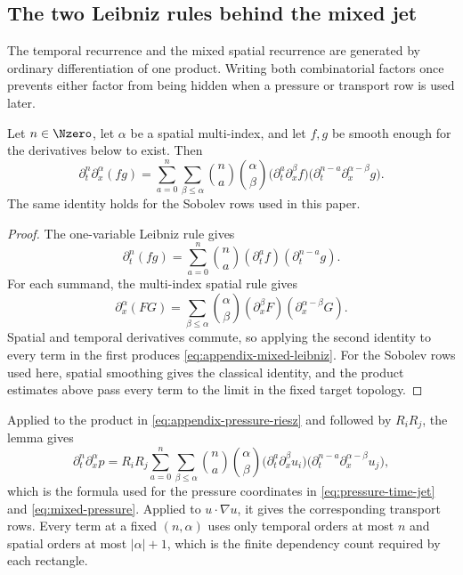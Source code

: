 \subsection{The two Leibniz rules behind the mixed jet}

The temporal recurrence and the mixed spatial recurrence are generated by ordinary differentiation of one product.
Writing both combinatorial factors once prevents either factor from being hidden when a pressure or transport row is used later.

\begin{lemma}
\label{lem:appendix-mixed-leibniz}
Let \(n\in\Nzero\), let \(\alpha\) be a spatial multi-index, and let \(f,g\) be smooth enough for the derivatives below to exist.
Then
\begin{equation}
 \partial_t^n\partial_x^\alpha(fg)
 =
 \sum_{a=0}^{n}\sum_{\beta\le\alpha}
 \binom na\binom\alpha\beta
 \bigl(\partial_t^a\partial_x^\beta f\bigr)
 \bigl(\partial_t^{n-a}\partial_x^{\alpha-\beta}g\bigr).
 \label{eq:appendix-mixed-leibniz}
\end{equation}
The same identity holds for the Sobolev rows used in this paper.
\end{lemma}

\begin{proof}
The one-variable Leibniz rule gives
\[
 \partial_t^n(fg)=\sum_{a=0}^n\binom na(\partial_t^af)(\partial_t^{n-a}g).
\]
For each summand, the multi-index spatial rule gives
\[
 \partial_x^\alpha(FG)
 =\sum_{\beta\le\alpha}\binom\alpha\beta
 (\partial_x^\beta F)(\partial_x^{\alpha-\beta}G).
\]
Spatial and temporal derivatives commute, so applying the second identity to every term in the first produces \eqref{eq:appendix-mixed-leibniz}.
For the Sobolev rows used here, spatial smoothing gives the classical identity, and the product estimates above pass every term to the limit in the fixed target topology.
\end{proof}

Applied to the product in \eqref{eq:appendix-pressure-riesz} and followed by \(R_iR_j\), the lemma gives
\[
 \partial_t^n\partial_x^\alpha p
 =
 R_iR_j
 \sum_{a=0}^{n}\sum_{\beta\le\alpha}
 \binom na\binom\alpha\beta
 \bigl(\partial_t^a\partial_x^\beta u_i\bigr)
 \bigl(\partial_t^{n-a}\partial_x^{\alpha-\beta}u_j\bigr),
\]
which is the formula used for the pressure coordinates in \eqref{eq:pressure-time-jet} and \eqref{eq:mixed-pressure}.
Applied to \(u\cdot\nabla u\), it gives the corresponding transport rows.
Every term at a fixed \((n,\alpha)\) uses only temporal orders at most \(n\) and spatial orders at most \(|\alpha|+1\), which is the finite dependency count required by each rectangle.

